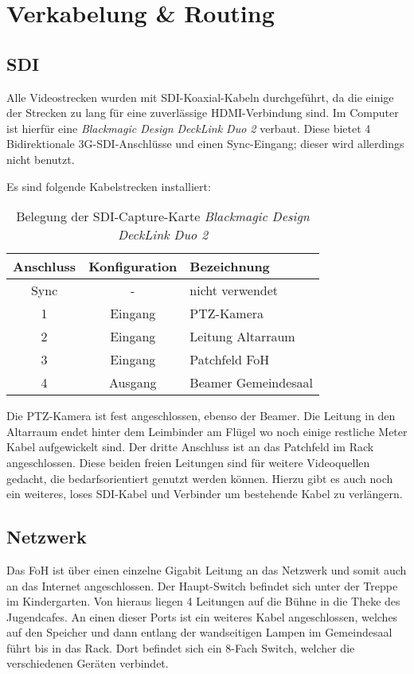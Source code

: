 \chapter{Verkabelung \& Routing}
	\section{SDI}
		Alle Videostrecken wurden mit \Gls{SDI}-Koaxial-Kabeln durchgeführt, da die einige der Strecken zu lang für eine zuverlässige HDMI-Verbindung sind.
		Im Computer ist hierfür eine \textit{Blackmagic Design DeckLink Duo 2} verbaut.
		Diese bietet 4 Bidirektionale 3G-\Gls{SDI}-Anschlüsse und einen Sync-Eingang; dieser wird allerdings nicht benutzt.

		Es sind folgende Kabelstrecken installiert:
		\begin{table}[h]
			\caption{Belegung der \Gls{SDI}-Capture-Karte \textit{Blackmagic Design DeckLink Duo 2}}
			\centering
			
			\begin{tabular}{ccl}
				\toprule
				Anschluss & Konfiguration & Bezeichnung \\
				\midrule
				Sync & - & nicht verwendet \\
				1 & Eingang & \Gls{PTZ-Kamera} \\
				2 & Eingang & Leitung Altarraum \\
				3 & Eingang & Patchfeld \Gls{FoH} \\
				4 & Ausgang & Beamer Gemeindesaal \\
				\bottomrule
			\end{tabular}
		\end{table}

		Die PTZ-Kamera ist fest angeschlossen, ebenso der Beamer.
		Die Leitung in den Altarraum endet hinter dem Leimbinder am Flügel wo noch einige restliche Meter Kabel aufgewickelt sind.
		Der dritte Anschluss ist an das Patchfeld im Rack angeschlossen.
		Diese beiden freien Leitungen sind für weitere Videoquellen gedacht, die bedarfsorientiert genutzt werden können.
		Hierzu gibt es auch noch ein weiteres, loses \Gls{SDI}-Kabel und Verbinder um bestehende Kabel zu verlängern.

	\section{Netzwerk}
		Das \Gls{FoH} ist über einen einzelne Gigabit Leitung an das Netzwerk und somit auch an das Internet angeschlossen.
		Der Haupt-Switch befindet sich unter der Treppe im Kindergarten.
		Von hieraus liegen 4 Leitungen auf die Bühne in die Theke des Jugendcafes.
		An einen dieser Ports ist ein weiteres Kabel angeschlossen, welches auf den Speicher und dann entlang der wandseitigen Lampen im Gemeindesaal führt bis in das Rack.
		Dort befindet sich ein 8-Fach Switch, welcher die verschiedenen Geräten verbindet.

